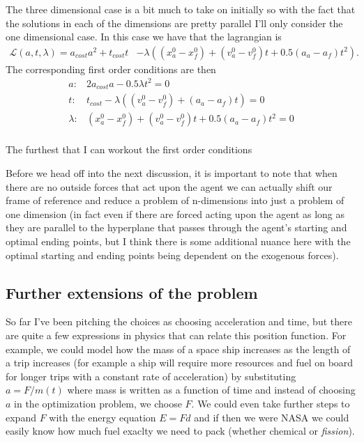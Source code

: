 \documentclass[11pt,english]{article}
\begin{document}
\noindent The three dimensional case is a bit much to take on initially so with the fact that the solutions in each of the dimensions are pretty parallel I'll only consider the one dimensional case. In this case we have that the lagrangian is
\begin{align*}
	\mathcal{L}(a,t,\lambda) = a_{cost}a^2 + t_{cost}t &- \lambda((x_{a}^0 - x_{f}^0) + (v_a^0-v_f^0)t + 0.5(a_a - a_f)t^2).
\end{align*}
The corresponding first order conditions are then
\begin{align*}
a:& 2a_{cost}a - 0.5\lambda t^2 = 0\\
t:& t_{cost} - \lambda((v_a^0-v_f^0) + (a_a - a_f)t) = 0\\
\lambda:& (x_{a}^0 - x_{f}^0) + (v_a^0-v_f^0)t + 0.5(a_a - a_f)t^2 = 0\\
\end{align*}

The furthest that I can workout the first order conditions          


\noindent Before we head off into the next discussion, it is important to note that when there are no outside forces that act upon the agent we can actually shift our frame of reference and reduce a problem of n-dimensions into just a problem of one dimension (in fact even if there are forced acting upon the agent as long as they are parallel to the hyperplane that passes through the agent's starting and optimal ending points, but I think there is some additional nuance here with the optimal starting and ending points being dependent on the exogenous forces).

\subsection*{Further extensions of the problem}

So far I've been pitching the choices as choosing acceleration and time, but there are quite a few expressions in physics that can relate this position function. For example, we could model how the mass of a space ship increases as the length of a trip increases (for example a ship will require more resources and fuel on board for longer trips with a constant rate of acceleration) by substituting $a = F/m(t)$ where mass is written as a function of time and instead of choosing $a$ in the optimization problem, we choose $F$. We could even take further steps to expand $F$ with the energy equation $E = Fd$ and if then we were NASA we could easily know how much fuel exaclty we need to pack (whether chemical or \textit{fission}).
\end{document}
